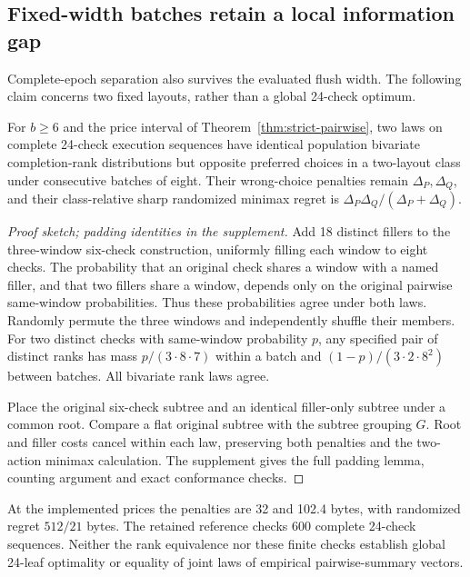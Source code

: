 \subsection{Fixed-width batches retain a local information gap}
Complete-epoch separation also survives the evaluated flush width.
The following claim concerns two fixed layouts, rather than a global
24-check optimum.
\begin{proposition}\label{prop:fixed-eight}
For $b\ge6$ and the price interval of Theorem~\ref{thm:strict-pairwise},
two laws on complete 24-check execution sequences have identical population
bivariate completion-rank distributions but opposite preferred choices
in a two-layout class under consecutive batches of eight. Their wrong-choice
penalties remain $\Delta_P,\Delta_Q$, and their class-relative sharp
randomized minimax regret is $\Delta_P\Delta_Q/(\Delta_P+\Delta_Q)$.
\end{proposition}
\begin{proof}[Proof sketch; padding identities in the supplement]
Add 18 distinct fillers to the three-window six-check construction,
uniformly filling each window to eight checks. The probability that an
original check shares a window with a named filler, and that two fillers
share a window, depends only on the original pairwise same-window
probabilities. Thus these probabilities agree under both laws.
Randomly permute the three windows and independently shuffle their members.
For two distinct checks with same-window probability $p$, any specified
pair of distinct ranks has mass $p/(3\cdot8\cdot7)$ within a batch and
$(1-p)/(3\cdot2\cdot8^2)$ between batches. All bivariate rank laws agree.

Place the original six-check subtree and an identical filler-only subtree
under a common root. Compare a flat original subtree with the subtree
grouping $G$. Root and filler costs cancel within each law, preserving
both penalties and the two-action minimax calculation. The supplement
gives the full padding lemma, counting argument and exact conformance
checks.
\end{proof}
At the implemented prices the penalties are 32 and 102.4 bytes, with
randomized regret $512/21$ bytes. The retained reference checks 600
complete 24-check sequences. Neither the rank equivalence nor these finite
checks establish global 24-leaf optimality or equality of joint laws of
empirical pairwise-summary vectors.
